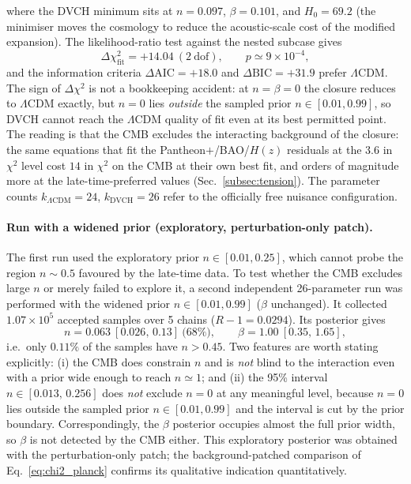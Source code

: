 \documentclass[pdflatex,sn-mathphys-num]{sn-jnl}%
\begin{document}
where the DVCH minimum sits at $n=0.097$, $\beta=0.101$, and $H_0=69.2$
(the minimiser moves the cosmology to reduce the acoustic-scale cost of
the modified expansion). The likelihood-ratio test against the nested
subcase gives
\begin{equation}
\Delta\chi^2_{\mathrm{fit}} = +14.04\ (2\ \mathrm{dof}),\qquad
p \simeq 9\times10^{-4},
\end{equation}
and the information criteria
$\Delta\mathrm{AIC}=+18.0$ and $\Delta\mathrm{BIC}=+31.9$ prefer
$\Lambda$CDM. The sign of $\Delta\chi^2$ is not a bookkeeping accident:
at $n=\beta=0$ the closure reduces to $\Lambda$CDM exactly, but $n=0$
lies \emph{outside} the sampled prior $n\in[0.01,0.99]$, so DVCH cannot
reach the $\Lambda$CDM quality of fit even at its best permitted point.
The reading is that the CMB excludes the interacting background of the
closure: the same equations that fit the Pantheon$+$/BAO/$H(z)$ residuals
at the $3.6$ in $\chi^2$ level cost $14$ in $\chi^2$ on the CMB at their
own best fit, and orders of magnitude more at the late-time-preferred
values (Sec.~\ref{subsec:tension}). The parameter counts
$k_{\Lambda\mathrm{CDM}}=24$, $k_{\mathrm{DVCH}}=26$ refer to the
officially free nuisance configuration.

\paragraph{Run with a widened prior (exploratory, perturbation-only patch).}
The first run used the exploratory prior $n\in[0.01,0.25]$, which cannot
probe the region $n\sim0.5$ favoured by the late-time data. To test whether
the CMB excludes large $n$ or merely failed to explore it, a second
independent 26-parameter run was performed with the widened prior
$n\in[0.01,0.99]$ ($\beta$ unchanged). It collected $1.07\times10^5$ accepted
samples over 5 chains ($R-1=0.0294$). Its posterior gives
\begin{equation}
n = 0.063\ [0.026,\,0.13]\ \text{(68\%)},\qquad
\beta = 1.00\ [0.35,\,1.65],
\label{eq:n_planck_posterior}
\end{equation}
i.e.\ only $0.11\%$ of the samples have $n>0.45$. Two
features are worth stating explicitly:
(i) the CMB does constrain $n$ and is \emph{not} blind to the interaction even
with a prior wide enough to reach $n\simeq1$; and (ii) the 95\% interval
$n\in[0.013,\,0.256]$ does \emph{not} exclude $n=0$ at any meaningful level,
because $n=0$ lies outside the sampled prior $n\in[0.01,0.99]$ and the
interval is cut by the prior boundary. Correspondingly, the $\beta$
posterior occupies almost the full prior width, so $\beta$ is not detected
by the CMB either. This exploratory posterior was obtained with the
perturbation-only patch; the background-patched comparison of
Eq.~\ref{eq:chi2_planck} confirms its qualitative indication
quantitatively.
\end{document}
